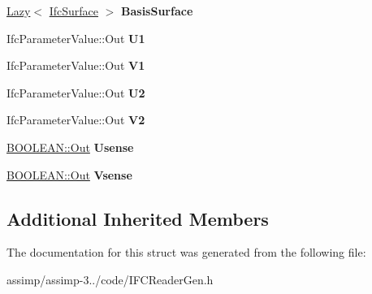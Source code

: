 \begin{DoxyCompactItemize}
\item 
\hypertarget{struct_assimp_1_1_i_f_c_1_1_ifc_rectangular_trimmed_surface_ae5e96536959b41a4f362abf5d7d7fd2d}{\hyperlink{struct_assimp_1_1_s_t_e_p_1_1_lazy}{Lazy}$<$ \hyperlink{struct_assimp_1_1_i_f_c_1_1_ifc_surface}{Ifc\+Surface} $>$ {\bfseries Basis\+Surface}}\label{struct_assimp_1_1_i_f_c_1_1_ifc_rectangular_trimmed_surface_ae5e96536959b41a4f362abf5d7d7fd2d}

\item 
\hypertarget{struct_assimp_1_1_i_f_c_1_1_ifc_rectangular_trimmed_surface_a7d5ef98187f6234f927e7b884993a8c6}{Ifc\+Parameter\+Value\+::\+Out {\bfseries U1}}\label{struct_assimp_1_1_i_f_c_1_1_ifc_rectangular_trimmed_surface_a7d5ef98187f6234f927e7b884993a8c6}

\item 
\hypertarget{struct_assimp_1_1_i_f_c_1_1_ifc_rectangular_trimmed_surface_a3737e8445abb96dbbc72a53a36ac07f9}{Ifc\+Parameter\+Value\+::\+Out {\bfseries V1}}\label{struct_assimp_1_1_i_f_c_1_1_ifc_rectangular_trimmed_surface_a3737e8445abb96dbbc72a53a36ac07f9}

\item 
\hypertarget{struct_assimp_1_1_i_f_c_1_1_ifc_rectangular_trimmed_surface_ae61de07f2a0b1b7a67909261f83abaa3}{Ifc\+Parameter\+Value\+::\+Out {\bfseries U2}}\label{struct_assimp_1_1_i_f_c_1_1_ifc_rectangular_trimmed_surface_ae61de07f2a0b1b7a67909261f83abaa3}

\item 
\hypertarget{struct_assimp_1_1_i_f_c_1_1_ifc_rectangular_trimmed_surface_a5a841c2e04a967d515126c32fb649d79}{Ifc\+Parameter\+Value\+::\+Out {\bfseries V2}}\label{struct_assimp_1_1_i_f_c_1_1_ifc_rectangular_trimmed_surface_a5a841c2e04a967d515126c32fb649d79}

\item 
\hypertarget{struct_assimp_1_1_i_f_c_1_1_ifc_rectangular_trimmed_surface_a5842edec035fb9dc6818fad0912cacf0}{\hyperlink{classboost_1_1shared__ptr}{B\+O\+O\+L\+E\+A\+N\+::\+Out} {\bfseries Usense}}\label{struct_assimp_1_1_i_f_c_1_1_ifc_rectangular_trimmed_surface_a5842edec035fb9dc6818fad0912cacf0}

\item 
\hypertarget{struct_assimp_1_1_i_f_c_1_1_ifc_rectangular_trimmed_surface_a4562adae866c7b1f687248c4ad8aa48e}{\hyperlink{classboost_1_1shared__ptr}{B\+O\+O\+L\+E\+A\+N\+::\+Out} {\bfseries Vsense}}\label{struct_assimp_1_1_i_f_c_1_1_ifc_rectangular_trimmed_surface_a4562adae866c7b1f687248c4ad8aa48e}

\end{DoxyCompactItemize}
\subsection*{Additional Inherited Members}


The documentation for this struct was generated from the following file\+:\begin{DoxyCompactItemize}
\item 
assimp/assimp-\/3../code/I\+F\+C\+Reader\+Gen.\+h\end{DoxyCompactItemize}
